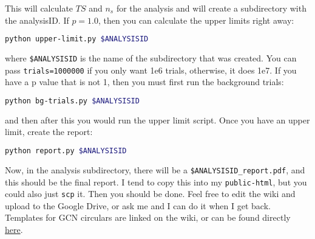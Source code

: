 This will calculate $TS$ and $n_s$ for the analysis and will create a subdirectory with the analysisID. If $p=1.0$, then you can calculate the upper limits right away: 

\begin{lstlisting}[language=bash]
python upper-limit.py $ANALYSISID
\end{lstlisting}

where \texttt{\$ANALYSISID} is the name of the subdirectory that was created. You can pass \texttt{trials=1000000} if you only want 1e6 trials, otherwise, it does 1e7. If you have a p value that is not 1, then you must first run the background trials: 

\begin{lstlisting}[language=bash]
python bg-trials.py $ANALYSISID
\end{lstlisting}

and then after this you would run the upper limit script. Once you have an upper limit, create the report:

\begin{lstlisting}[language=bash]
python report.py $ANALYSISID
\end{lstlisting}

Now, in the analysis subdirectory, there will be a \texttt{\$ANALYSISID\_report.pdf}, and this should be the final report. I tend to copy this into my \texttt{public-html}, but you could also just \texttt{scp} it. Then you should be done. Feel free to edit the wiki and upload to the Google Drive, or ask me and I can do it when I get back. Templates for GCN circulars are linked on the wiki, or can be found directly \href{https://wiki.icecube.wisc.edu/index.php/Fast_Response_ATel_and_GCN_Templates}{here}.